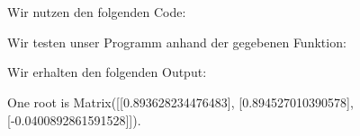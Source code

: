 \section{}

Wir nutzen den folgenden Code: 



Wir testen unser Programm anhand der gegebenen Funktion:



Wir erhalten den folgenden Output:

\begin{consoleoutput}
One root is Matrix([[0.893628234476483], [0.894527010390578], [-0.0400892861591528]]).
\end{consoleoutput}
